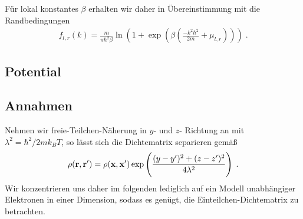 Für lokal konstantes $\beta$ erhalten wir daher in Übereinstimmung mit \cite{frensley2} die Randbedingungen
\begin{align}
  f_{l,r} (k) = \frac{m}{\pi\hbar^2\beta} \ln(1+\exp(\beta(\frac{- k^2\hbar^2}{2m} + \mu_{l,r}))) \; .
\end{align}

\subsection{Potential}


\subsection{Annahmen}



Nehmen wir freie-Teilchen-Näherung in $y$- und $z$- Richtung an mit $\lambda^2 = \hbar^2/2mk_B T$, so lässt sich die Dichtematrix separieren \cite{grubin1993transport} gemäß
\begin{equation}
  \rho(\vb{r},\vb{r}') = \rho(\vb{x},\vb{x}') \exp\left( \frac{(y-y')^2 + (z-z')^2}{4\lambda^2}\right) \; .
\end{equation}
Wir konzentrieren uns daher im folgenden lediglich auf ein Modell unabhängiger Elektronen in einer Dimension, sodass es genügt, die Einteilchen-Dichtematrix zu betrachten.



